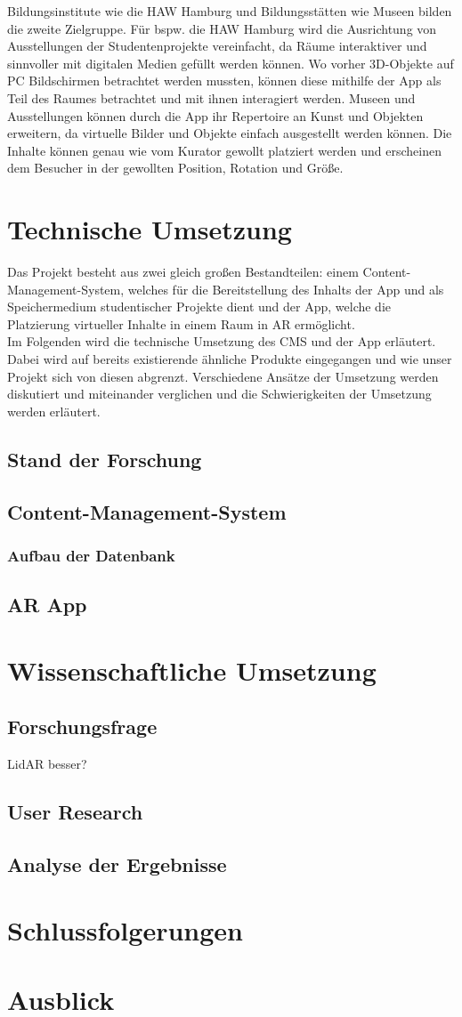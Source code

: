 \documentclass[12pt,a4paper]{article}
\begin{document}
Bildungsinstitute wie die HAW Hamburg und Bildungsstätten wie Museen bilden die zweite Zielgruppe. Für bspw. die HAW Hamburg wird die Ausrichtung von Ausstellungen der Studentenprojekte vereinfacht, da Räume interaktiver und sinnvoller mit digitalen Medien gefüllt werden können. Wo vorher 3D-Objekte auf PC Bildschirmen betrachtet werden mussten, können diese mithilfe der App als Teil des Raumes betrachtet und mit ihnen interagiert werden. Museen und Ausstellungen können durch die App ihr Repertoire an Kunst und Objekten erweitern, da virtuelle Bilder und Objekte einfach ausgestellt werden können. Die Inhalte können genau wie vom Kurator gewollt platziert werden und erscheinen dem Besucher in der gewollten Position, Rotation und Größe.

\section{Technische Umsetzung}
Das Projekt besteht aus zwei gleich großen Bestandteilen: einem Content-Management-System, welches für die Bereitstellung des Inhalts der App und als Speichermedium studentischer Projekte dient und der App, welche die Platzierung virtueller Inhalte in einem Raum in AR ermöglicht.\\
Im Folgenden wird die technische Umsetzung des CMS und der App erläutert. Dabei wird auf bereits existierende ähnliche Produkte eingegangen und wie unser Projekt sich von diesen abgrenzt. Verschiedene Ansätze der Umsetzung werden diskutiert und miteinander verglichen und die Schwierigkeiten der Umsetzung werden erläutert.
\subsection{Stand der Forschung}
\subsection{Content-Management-System}
\subsubsection{Aufbau der Datenbank}
\subsection{AR App}
\section{Wissenschaftliche Umsetzung}
\subsection{Forschungsfrage}
\glqq LidAR besser? \grqq{}
\subsection{User Research}
\subsection{Analyse der Ergebnisse}
\section{Schlussfolgerungen}
\section{Ausblick}
\end{document}

